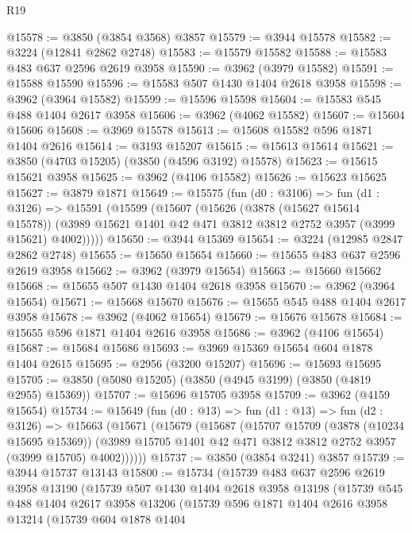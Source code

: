 \begin{lexlean}{R19}
\begin{coremodule}
@15578 := @3850 (@3854 @3568) @3857
@15579 := @3944 @15578
@15582 := @3224 (@12841 @2862 @2748)
@15583 := @15579 @15582
@15588 := @15583 @483 @637 @2596 @2619 @3958
@15590 := @3962 (@3979 @15582)
@15591 := @15588 @15590
@15596 := @15583 @507 @1430 @1404 @2618 @3958
@15598 := @3962 (@3964 @15582)
@15599 := @15596 @15598
@15604 := @15583 @545 @488 @1404 @2617 @3958
@15606 := @3962 (@4062 @15582)
@15607 := @15604 @15606
@15608 := @3969 @15578
@15613 := @15608 @15582 @596 @1871 @1404 @2616
@15614 := @3193 @15207
@15615 := @15613 @15614
@15621 := @3850 (@4703 @15205) (@3850 (@4596 @3192) @15578)
@15623 := @15615 @15621 @3958
@15625 := @3962 (@4106 @15582)
@15626 := @15623 @15625
@15627 := @3879 @1871
@15649 := @15575
    (fun (d0 : @3106) =>
    fun (d1 : @3126) =>
    @15591
      (@15599
        (@15607
          (@15626
            (@3878 (@15627 @15614 @15578))
            (@3989 @15621 @1401 @42 @471 @3812 @3812 @2752 @3957 (@3999 @15621) @4002)))))
@15650 := @3944 @15369
@15654 := @3224 (@12985 @2847 @2862 @2748)
@15655 := @15650 @15654
@15660 := @15655 @483 @637 @2596 @2619 @3958
@15662 := @3962 (@3979 @15654)
@15663 := @15660 @15662
@15668 := @15655 @507 @1430 @1404 @2618 @3958
@15670 := @3962 (@3964 @15654)
@15671 := @15668 @15670
@15676 := @15655 @545 @488 @1404 @2617 @3958
@15678 := @3962 (@4062 @15654)
@15679 := @15676 @15678
@15684 := @15655 @596 @1871 @1404 @2616 @3958
@15686 := @3962 (@4106 @15654)
@15687 := @15684 @15686
@15693 := @3969 @15369 @15654 @604 @1878 @1404 @2615
@15695 := @2956 (@3200 @15207)
@15696 := @15693 @15695
@15705 := @3850 (@5080 @15205) (@3850 (@4945 @3199) (@3850 (@4819 @2955) @15369))
@15707 := @15696 @15705 @3958
@15709 := @3962 (@4159 @15654)
@15734 := @15649
    (fun (d0 : @13) =>
    fun (d1 : @13) =>
    fun (d2 : @3126) =>
    @15663
      (@15671
        (@15679
          (@15687
            (@15707
              @15709
              (@3878 (@10234 @15695 @15369))
              (@3989 @15705 @1401 @42 @471 @3812 @3812 @2752 @3957 (@3999 @15705) @4002))))))
@15737 := @3850 (@3854 @3241) @3857
@15739 := @3944 @15737 @13143
@15800 := @15734
    (@15739
      @483
      @637
      @2596
      @2619
      @3958
      @13190
      (@15739
        @507
        @1430
        @1404
        @2618
        @3958
        @13198
        (@15739
          @545
          @488
          @1404
          @2617
          @3958
          @13206
          (@15739
            @596
            @1871
            @1404
            @2616
            @3958
            @13214
            (@15739
              @604
              @1878
              @1404

\end{coremodule}
\end{lexlean}
